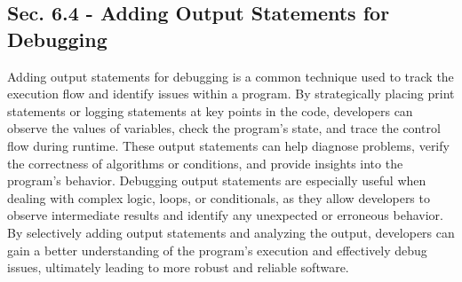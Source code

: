 \subsection*{Sec. 6.4 - Adding Output Statements for Debugging}

Adding output statements for debugging is a common technique used to track the execution flow and identify issues within a program. By strategically placing print statements or logging statements at key points in the code, developers can observe the values of variables, check the program's state, and trace 
the control flow during runtime. These output statements can help diagnose problems, verify the correctness of algorithms or conditions, and provide insights into the program's behavior. Debugging output statements are especially useful when dealing with complex logic, loops, or conditionals, as they allow 
developers to observe intermediate results and identify any unexpected or erroneous behavior. By selectively adding output statements and analyzing the output, developers can gain a better understanding of the program's execution and effectively debug issues, ultimately leading to more robust and reliable software.

